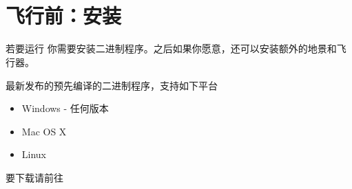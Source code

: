 
\ifchinese
\chapter{{\\}飞行前：安装 \FlightGear{}}
\fi
{}
\label{prefligh}

\ifchinese
若要运行 \FlightGear{} 你需要安装二进制程序。之后如果你愿意，还可以安装额外的地景和飞行器。

最新发布的预先编译的二进制程序，支持如下平台

\begin{itemize}
\item Windows - 任何版本
\item Mac OS X
\item Linux
\end{itemize}

要下载请前往

